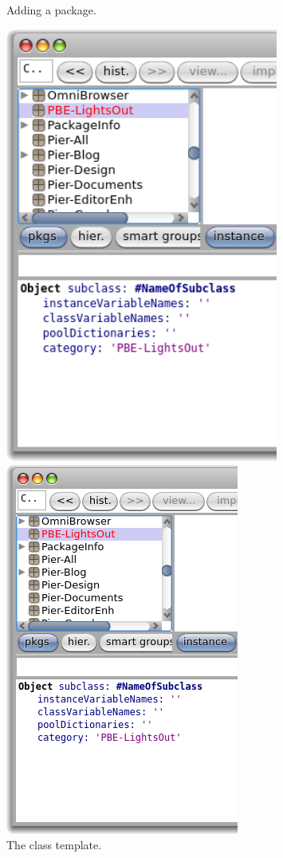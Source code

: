 \documentclass[a4paper,10pt,twoside]{book}
\begin{document}
\begin{figure}[htb]
\begin{minipage}[b]{0.48\textwidth}
	\caption{Adding a package.
	\label{fig:addPackage}}
\end{minipage}
\hfill
\begin{minipage}[b]{0.48\textwidth}
\ifluluelse
	{\centerline {\includegraphics[width=0.8\textwidth]{ClassTemplate}}}
	{\centerline {\includegraphics[scale=0.6]{ClassTemplate}}}
	\caption{The class template.
	\label{fig:classTemplate}}
\end{minipage}
\end{figure}
\end{document}
